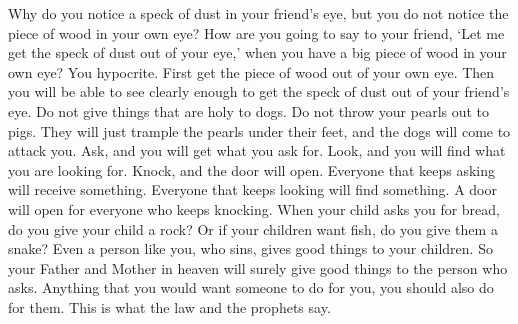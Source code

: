 Why do you notice a speck of dust in your friend's eye, but you do not notice the piece of wood in your own eye?
\bverse \iffalse Or how wilt thou say to thy brother: Let me pull the mote out of thine eye--and behold, a beam is in thine own eye? \fi
How are you going to say to your friend, \lq Let me get the speck of dust out of your eye,\rq{} when you have a big piece of wood in your own eye?
\bverse \iffalse Thou hypocrite, first cast the beam out of thine own eye; and then shalt thou see clearly to cast the mote out of thy brother's eye. \fi
You hypocrite. First get the piece of wood out of your own eye. Then you will be able to see clearly enough to get the speck of dust out of your friend's eye.
\bverse \iffalse Give not that which is holy unto the dogs, neither cast ye your pearls before swine, lest they trample them under their feet, and turn again and rend you. \fi
Do not give things that are holy to dogs. Do not throw your pearls out to pigs. They will just trample the pearls under their feet, and the dogs will come to attack you.
\bverse \iffalse Ask, and it shall be given unto you; seek, and ye shall find; knock, and it shall be opened unto you. \fi
Ask, and you will get what you ask for. Look, and you will find what you are looking for. Knock, and the door will open.
\bverse \iffalse For every one that asketh, receiveth; and he that seeketh, findeth; and to him that knocketh, it shall be opened. \fi
Everyone that keeps asking will receive something. Everyone that keeps looking will find something. A door will open for everyone who keeps knocking.
\bverse \iffalse Or what man is there of you, who, if his son ask bread, will give him a stone? \fi
When your child asks you for bread, do you give your child a rock?
\bverse \iffalse Or if he ask a fish, will he give him a serpent? \fi
Or if your children want fish, do you give them a snake?
\bverse \iffalse If ye then, being evil, know how to give good gifts unto your children, how much more shall your Father who is in heaven give good things to them that ask him? \fi
Even a person like you, who sins, gives good things to your children. So your Father and Mother in heaven will surely give good things to the person who asks.
\bverse \iffalse Therefore, all things whatsoever ye would that men should do to you, do ye even so to them, for this is the law and the prophets. \fi
Anything that you would want someone to do for you, you should also do for them. This is what the law and the prophets say.
